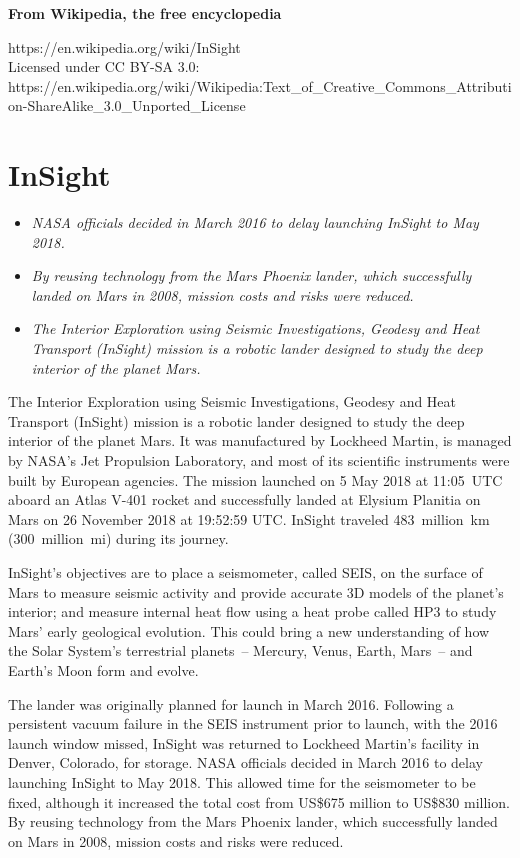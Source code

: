\textbf{From Wikipedia, the free encyclopedia}

https://en.wikipedia.org/wiki/InSight\\
Licensed under CC BY-SA 3.0:\\
https://en.wikipedia.org/wiki/Wikipedia:Text\_of\_Creative\_Commons\_Attribution-ShareAlike\_3.0\_Unported\_License

\section{InSight}\label{insight}

\begin{itemize}
\item
  \emph{NASA officials decided in March 2016 to delay launching InSight
  to May 2018.}
\item
  \emph{By reusing technology from the Mars Phoenix lander, which
  successfully landed on Mars in 2008, mission costs and risks were
  reduced.}
\item
  \emph{The Interior Exploration using Seismic Investigations, Geodesy
  and Heat Transport (InSight) mission is a robotic lander designed to
  study the deep interior of the planet Mars.}
\end{itemize}

The Interior Exploration using Seismic Investigations, Geodesy and Heat
Transport (InSight) mission is a robotic lander designed to study the
deep interior of the planet Mars. It was manufactured by Lockheed
Martin, is managed by NASA's Jet Propulsion Laboratory, and most of its
scientific instruments were built by European agencies. The mission
launched on 5 May 2018 at 11:05~UTC aboard an Atlas V-401 rocket and
successfully landed at Elysium Planitia on Mars on 26 November 2018 at
19:52:59 UTC. InSight traveled 483~million~km (300~million~mi) during
its journey.

InSight's objectives are to place a seismometer, called SEIS, on the
surface of Mars to measure seismic activity and provide accurate 3D
models of the planet's interior; and measure internal heat flow using a
heat probe called HP3 to study Mars' early geological evolution. This
could bring a new understanding of how the Solar System's terrestrial
planets~-- Mercury, Venus, Earth, Mars~-- and Earth's Moon form and
evolve.

The lander was originally planned for launch in March 2016. Following a
persistent vacuum failure in the SEIS instrument prior to launch, with
the 2016 launch window missed, InSight was returned to Lockheed Martin's
facility in Denver, Colorado, for storage. NASA officials decided in
March 2016 to delay launching InSight to May 2018. This allowed time for
the seismometer to be fixed, although it increased the total cost from
US\$675 million to US\$830 million. By reusing technology from the Mars
Phoenix lander, which successfully landed on Mars in 2008, mission costs
and risks were reduced.

